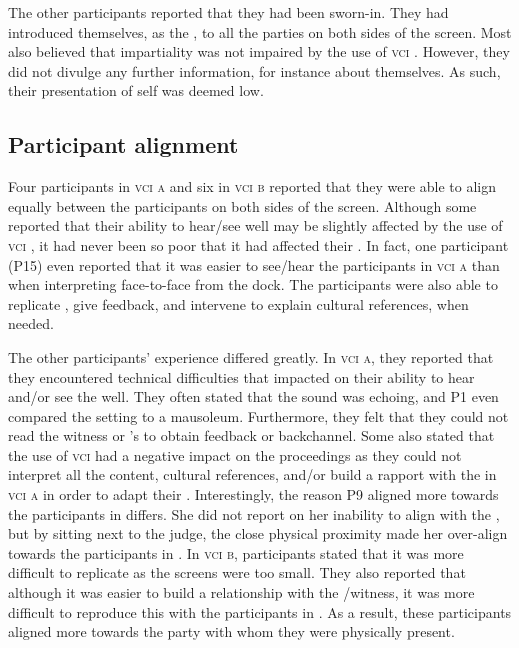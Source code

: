 \documentclass[output=paper]{langsci/langscibook}
\begin{document}
The other participants reported that they had been sworn-in. They had introduced themselves, as the , to all the parties on both sides of the screen. Most also believed that impartiality was not impaired by the use of \textsc{vci} . However, they did not divulge any further information, for instance about themselves. As such, their presentation of self was deemed low.

\subsection{Participant alignment}
Four participants in \textsc{vci a} and six in \textsc{vci b} reported that they were able to align equally between the participants on both sides of the screen. Although some reported that their ability to hear/see well may be slightly affected by the use of \textsc{vci} , it had never been so poor that it had affected their . In fact, one participant (P15) even reported that it was easier to see/hear the  participants in \textsc{vci a} than when interpreting face-to-face from the dock. The participants were also able to replicate , give feedback, and intervene to explain cultural references, when needed. 

The other participants’ experience differed greatly. In \textsc{vci a}, they reported that they encountered technical difficulties that impacted on their ability to hear and/or see the  well. They often stated that the sound was echoing, and P1 even compared the setting to a mausoleum. Furthermore, they felt that they could not read the witness or ’s  to obtain feedback or backchannel. Some also stated that the use of \textsc{vci}  had a negative impact on the proceedings as they could not interpret all the content, cultural references, and/or build a rapport with the  in \textsc{vci a} in order to adapt their . Interestingly, the reason P9 aligned more towards the participants in  differs. She did not report on her inability to align with the , but by sitting next to the judge, the close physical proximity made her over-align towards the participants in . In \textsc{vci b}, participants stated that it was more difficult to replicate  as the screens were too small. They also reported that although it was easier to build a relationship with the /witness, it was more difficult to reproduce this with the participants in . As a result, these participants aligned more towards the party with whom they were physically present. 
\end{document}
